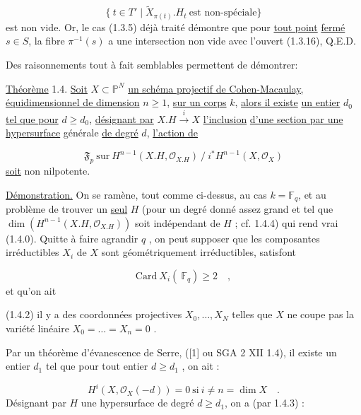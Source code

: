 \begin{equation}\tag{1.3.16}
\{\ t \in T' \mid \widetilde{X}_{\pi(t)}.H_t \ \mbox{est non-spéciale}\}
\end{equation}
est non vide. Or, le cas (1.3.5) déjà traité démontre que pour \underline{tout point}
\underline{fermé} $s \in S$, la fibre $\pi^{-1}(s)$ a une intersection non vide avec l'ouvert (1.3.16), Q.E.D.

Des raisonnements tout à fait semblables permettent de démontrer:

\underline{Théorème} 1.4. \underline{Soit} $X \subset \mathbb{P}^N$ \underline{un schéma projectif de Cohen-Macaulay,} \underline{équidimensionnel de dimension} $n \geq 1$, \underline{sur un corps} $k$, \underline{alors il existe} \underline{un entier} $d_0$ \underline{tel que pour} $d \geq d_0$, \underline{désignant par} $X.H \stackrel{i}{\longrightarrow} X$ \underline{l'inclusion} \underline{d'une section par une hypersurface} générale \underline{de degré} $d$, \underline{l'action de}

\begin{equation}\tag{1.4.0}
\mathfrak{F}_p \ \mathrm{sur}\ H^{n-1}(X.H,\mathcal{O}_{X.H}) \ /\ i^{*}H^{n-1}(X,\mathcal{O}_X)
\end{equation}
\underline{soit} non nilpotente.

\underline{Démonstration.} On se ramène, tout comme ci-dessus, au cas $k = \mathbb{F}_q$, et au problème de trouver un \underline{seul} $H$ (pour un degré donné assez grand et tel que $\dim(H^{n-1}(X.H,\mathcal{O}_{X.H}))$ soit indépendant de $H$ ; cf. 1.4.4) qui rend vrai (1.4.0). Quitte à faire agrandir $q$ , on peut supposer que les composantes irréductibles $X_i$ de $X$ sont géométriquement irréductibles, satisfont

\begin{equation}\tag{1.4.1}
\mathrm{Card}\ X_i(\ \mathbb{F}_q) \geq 2 \quad ,
\end{equation}
et qu'on ait

(1.4.2) il y a des coordonnées projectives $X_0,\ldots,X_N$ telles que $X$ ne coupe pas la variété linéaire $X_0 = \ldots = X_n = 0$ .

Par un théorème d'évanescence de Serre, ([1] ou SGA 2 XII 1.4), il existe un entier $d_1$ tel que pour tout entier $d \geq d_1$ , on ait :



\begin{equation}\tag{1.4.3}
H^i(X,\mathcal{O}_X(-d)) = 0 \ \mathrm{si}\ i \neq n = \dim X \quad .
\end{equation}
Désignant par $H$ une hypersurface de degré $d \geq d_1$, on a (par 1.4.3) :

